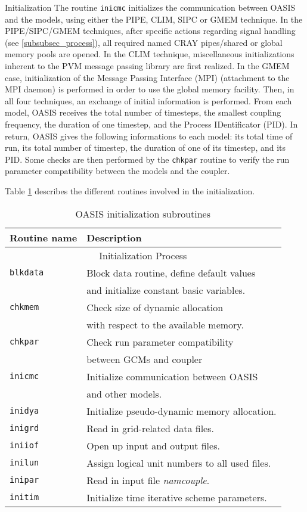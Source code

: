 \begin{subsection}{Initialization}
The routine {\tt inicmc} initializes the communication between OASIS 
and the models, using either the PIPE, CLIM, SIPC or GMEM technique. In the 
PIPE/SIPC/GMEM techniques, after specific actions regarding signal handling
(see \ref{subsubsec_process}), all required 
named CRAY pipes/shared or global memory pools are opened. In the CLIM 
technique, miscellaneous initializations inherent to the PVM message passing 
library are first realized. In the GMEM case, initialization of the
Message Passing Interface (MPI) (attachment to the MPI daemon) is
performed in order to use the global memory facility.
Then, in all four techniques, an exchange
of initial information is performed.
From each model, OASIS receives 
the total number of timesteps, the smallest coupling frequency, 
the duration of one timestep, and
the Process IDentificator (PID). In return, OASIS gives the following
informations to each model: its total time of run, its total number
of timestep, the duration of one of its timestep, and its PID.
Some checks are then performed by the {\tt chkpar} routine to verify the
run parameter compatibility between the models and the coupler.

\vspace{0.4cm}

Table \ref{tab.init} describes the different routines involved in the
initialization.
\begin{table}[hbtp]
\begin{center}
\begin{tabular}{|l|l|}
\hline
Routine name & Description \\
\hline
\hline
\multicolumn{2}{|c|}{Initialization Process} \\
\hline
{\tt blkdata }& Block data routine, define default values  \\
 & and initialize constant basic variables. \\
{\tt chkmem  }& Check size of dynamic allocation \\
 & with respect to the available memory. \\
{\tt chkpar }& Check run parameter compatibility \\
 & between GCMs and coupler \\
{\tt inicmc  }& Initialize communication between OASIS  \\
 & and other models. \\
{\tt inidya  }& Initialize pseudo-dynamic memory allocation. \\
{\tt inigrd  }& Read in grid-related data files. \\
{\tt iniiof  }& Open up input and output files. \\
{\tt inilun  }& Assign logical unit numbers to all used files. \\
{\tt inipar  }& Read in input file {\em namcouple}. \\
{\tt initim  }& Initialize time iterative scheme parameters. \\
\hline
\end{tabular}
\end{center}
\caption{OASIS initialization subroutines}
\label{tab.init}
\end{table}


\end{subsection}
